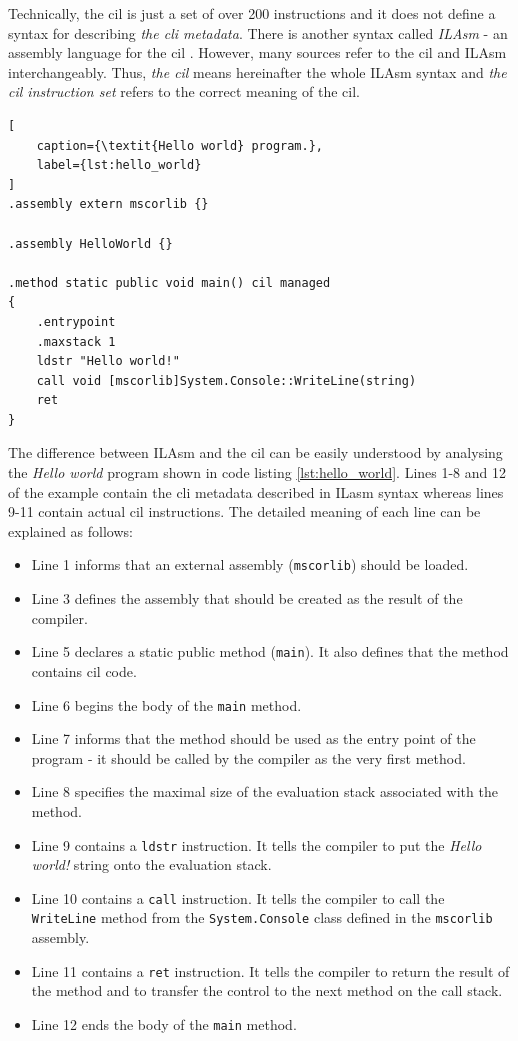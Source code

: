 \documentclass{article}
\numberwithin{equation}{section}
\begin{document}
Technically, the \acrshort{cil} is just a set of over 200 instructions and it does not define a syntax for describing \textit{the \acrshort{cli} metadata}. There is another syntax called \textit{ILAsm} - an assembly language for the \acrshort{cil} \cite{ecmaStandard}. However, many sources refer to the \acrshort{cil} and ILAsm interchangeably. Thus, \textit{the \acrshort{cil}} means hereinafter the whole ILAsm syntax and \textit{the \acrshort{cil} instruction set} refers to the correct meaning of the \acrlong{cil}.

\begin{lstlisting}[
	caption={\textit{Hello world} program.},
	label={lst:hello_world}
]
.assembly extern mscorlib {}

.assembly HelloWorld {}

.method static public void main() cil managed
{
	.entrypoint
	.maxstack 1
	ldstr "Hello world!"
	call void [mscorlib]System.Console::WriteLine(string)
	ret
}
\end{lstlisting}

The difference between ILAsm and the \acrshort{cil} can be easily understood by analysing the \textit{Hello world} program shown in code listing \ref{lst:hello_world}. Lines 1-8 and 12 of the example contain the \acrshort{cli} metadata described in ILasm syntax whereas lines 9-11 contain actual \acrshort{cil} instructions. The detailed meaning of each line can be explained as follows:
\begin{itemize}
	\item{Line 1 informs that an external assembly (\texttt{mscorlib}) should be loaded.}
	\item{Line 3 defines the assembly that should be created as the result of the compiler.}
	\item{Line 5 declares a static public method (\texttt{main}). It also defines that the method contains \acrshort{cil} code.}
	\item{Line 6 begins the body of the \texttt{main} method.}
	\item{Line 7 informs that the method should be used as the entry point of the program - it should be called by the compiler as the very first method.}
	\item{Line 8 specifies the maximal size of the evaluation stack associated with the method.}
	\item{Line 9 contains a \texttt{ldstr} instruction. It tells the compiler to put the \textit{Hello world!} string onto the evaluation stack.}
	\item{Line 10 contains a \texttt{call} instruction. It tells the compiler to call the \texttt{WriteLine} method from the \texttt{System.Console} class defined in the \texttt{mscorlib} assembly.}
	\item{Line 11 contains a \texttt{ret} instruction. It tells the compiler to return the result of the method and to transfer the control to the next method on the call stack.}
	\item{Line 12 ends the body of the \texttt{main} method.}
\end{itemize}
\end{document}
